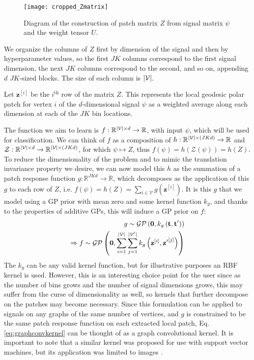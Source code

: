 \documentclass{article}
\DeclarePairedDelimiter\abs{\lvert}{\rvert}\DeclarePairedDelimiter\norm{\lVert}{\rVert}\newcommand{\p}[1]{\left(#1\right)}
\newcommand{\qb}[1]{ \left[#1 \right]}
\begin{document}
\begin{figure}[t]
\centering
\texttt{[image: cropped\_Zmatrix]}
\caption{Diagram of the construction of patch matrix $Z$ from signal matrix $\psi$ and the weight tensor $U$.}\label{fig:Zmatrix}
\end{figure}

We organize the columns of $Z$ first by dimension of the signal and then by hyperparameter values, so the first $JK$ columns correspond to the first signal dimension, the next $JK$ columns correspond to the second, and so on, appending $d$ $JK$-sized blocks. The size of each column is $\abs{\mathcal{V}}$.

Let $\mathbf{z}^{\qb{i}}$ be the $i^{\text{th}}$ row of the matrix $Z$. This represents the local geodesic polar patch for vertex $i$ of the $d$-dimensional signal $\psi$ as a weighted average along each dimension at each of the $JK$ bin locations.

The function we aim to learn is $f: \mathbb{R}^{\abs{\mathcal{V}} \times d} \to \mathbb{R}$, with input $\psi$, which will be used for classification.  We can think of $f$ as a composition of $h: \mathbb{R}^{\abs{\mathcal{V}}\times (JKd)} \to \mathbb{R}$ and $\mathcal{Z}: \mathbb{R}^{\abs{\mathcal{V}}\times d} \to \mathbb{R}^{\abs{\mathcal{V}}\times (JKd)}$, for which $\psi \mapsto Z$, thus $f(\psi) = h\p{\mathcal{Z}\p{\psi}} = h\p{Z}$. To reduce the dimensionality of the problem and to mimic the translation invariance property we desire, we can now model this $h$ as the summation of a patch response function $g:\mathbb{R}^{JKd} \to \mathbb{R}$, which decomposes as the application of this $g$ to each row of $Z$, i.e. $f(\psi) = h(Z) = \sum_{i \in \mathcal{V}} g(\mathbf{z}^{\qb{i}})$. It is this $g$ that we model using a GP prior with mean zero and some kernel function $k_g$, and thanks to the properties of additive GPs, this will induce a GP prior on $f$:
\begin{equation}\label{eq:graphconvkernel}
\begin{split}
g \sim \mathcal{GP}\p{\mathbf{0}, k_g\p{\mathbf{t}, {\mathbf{t}^\prime}}} \\ \Rightarrow f \sim \mathcal{GP}\p{\mathbf{0}, \sum_{i = 1}^{\abs{\mathcal{V}}}\sum_{j = 1}^{\abs{\mathcal{V^\prime}}} k_g\p{\mathbf{z}^{\qb{i}}, {\mathbf{z}^\prime}^{\qb{j}}}}
\end{split}
\end{equation}
The $k_g$ can be any valid kernel function, but for illustrative purposes an RBF kernel is used. However, this is an interesting choice point for the user since as the number of bins grows and the number of signal dimensions grows, this may suffer from the curse of dimensionality as well, so kernels that further decompose on the patches may become necessary. Since this formulation can be applied to signals on any graphs of the same number of vertices, and $g$ is constrained to be the same patch response function on each extracted local patch, Eq. \eqref{eq:graphconvkernel} can be thought of as a graph convolutional kernel. It is important to note that a similar kernel was proposed for use with support vector machines, but its application was limited to images \citep{convsvm}.
\end{document}
